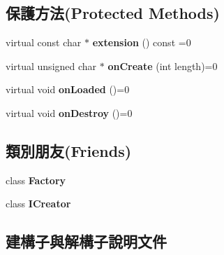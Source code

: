 \subsection*{保護方法(Protected Methods)}
\begin{DoxyCompactItemize}
\item 
virtual const char $\ast$ {\bfseries extension} () const  =0\hypertarget{class_magnum_1_1_resource_access_a14269a8f1df85c696739572afff4a0a2}{}\label{class_magnum_1_1_resource_access_a14269a8f1df85c696739572afff4a0a2}

\item 
virtual unsigned char $\ast$ {\bfseries on\+Create} (int length)=0\hypertarget{class_magnum_1_1_resource_access_a443332834bd368346df79be6941d8e58}{}\label{class_magnum_1_1_resource_access_a443332834bd368346df79be6941d8e58}

\item 
virtual void {\bfseries on\+Loaded} ()=0\hypertarget{class_magnum_1_1_resource_access_a812b6f26dc7e3eceafa3d0a7fb983132}{}\label{class_magnum_1_1_resource_access_a812b6f26dc7e3eceafa3d0a7fb983132}

\item 
virtual void {\bfseries on\+Destroy} ()=0\hypertarget{class_magnum_1_1_resource_access_a99508288dcbd3359a366214c8a1de5bf}{}\label{class_magnum_1_1_resource_access_a99508288dcbd3359a366214c8a1de5bf}

\end{DoxyCompactItemize}
\subsection*{類別朋友(Friends)}
\begin{DoxyCompactItemize}
\item 
class {\bfseries Factory}\hypertarget{class_magnum_1_1_resource_access_a328c093d609680cca505905c6d49901a}{}\label{class_magnum_1_1_resource_access_a328c093d609680cca505905c6d49901a}

\item 
class {\bfseries I\+Creator}\hypertarget{class_magnum_1_1_resource_access_a6d6e56ac47edfce9d2590e0757222ded}{}\label{class_magnum_1_1_resource_access_a6d6e56ac47edfce9d2590e0757222ded}

\end{DoxyCompactItemize}


\subsection{建構子與解構子說明文件}
